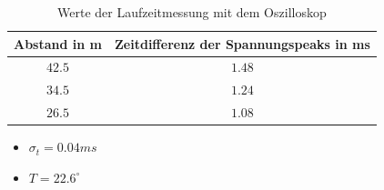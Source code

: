 \documentclass[11pt]{beamer}
\begin{document}
\begin{frame}
\begin{table}[H]\centering
\caption{Werte der Laufzeitmessung mit dem Oszilloskop}
\begin{tabular}{c|c}
Abstand in m & Zeitdifferenz der Spannungspeaks in ms\\ 
\hline
$42.5$& $1.48$\\ 
$34.5$& $1.24$\\
$26.5$& $1.08$\\
\end{tabular} 
\end{table}
\begin{itemize}
\item $\sigma_t=0.04ms$
\item $T=22.6^{\circ}$
\end{itemize}
\end{frame}
\end{document}
